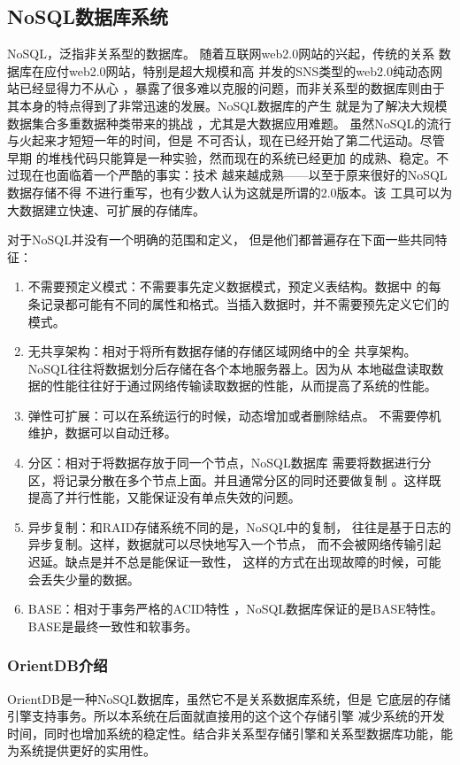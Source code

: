 \subsection{NoSQL数据库系统}
NoSQL，泛指非关系型的数据库。
随着互联网web2.0网站的兴起，传统的关系
数据库在应付web2.0网站，特别是超大规模和高
并发的SNS类型的web2.0纯动态网站已经显得力不从心
，暴露了很多难以克服的问题，而非关系型的数据库则由于
其本身的特点得到了非常迅速的发展。NoSQL数据库的产生
就是为了解决大规模数据集合多重数据种类带来的挑战
，尤其是大数据应用难题。
虽然NoSQL的流行与火起来才短短一年的时间，但是
不可否认，现在已经开始了第二代运动。尽管早期
的堆栈代码只能算是一种实验，然而现在的系统已经更加
的成熟、稳定。不过现在也面临着一个严酷的事实：技术
越来越成熟——以至于原来很好的NoSQL数据存储不得
不进行重写，也有少数人认为这就是所谓的2.0版本。该
工具可以为大数据建立快速、可扩展的存储库。

对于NoSQL并没有一个明确的范围和定义，
但是他们都普遍存在下面一些共同特征：
\begin{enumerate}[fullwidth,itemindent=2em]
	\item   不需要预定义模式：不需要事先定义数据模式，预定义表结构。数据中
	的每条记录都可能有不同的属性和格式。当插入数据时，并不需要预先定义它们的模式。
\item 	无共享架构：相对于将所有数据存储的存储区域网络中的全
共享架构。NoSQL往往将数据划分后存储在各个本地服务器上。因为从
本地磁盘读取数据的性能往往好于通过网络传输读取数据的性能，从而提高了系统的性能。
\item 	弹性可扩展：可以在系统运行的时候，动态增加或者删除结点。
不需要停机维护，数据可以自动迁移。
\item 	分区：相对于将数据存放于同一个节点，NoSQL数据库
需要将数据进行分区，将记录分散在多个节点上面。并且通常分区的同时还要做复制
。这样既提高了并行性能，又能保证没有单点失效的问题。
\item 	异步复制：和RAID存储系统不同的是，NoSQL中的复制，
往往是基于日志的异步复制。这样，数据就可以尽快地写入一个节点，
而不会被网络传输引起迟延。缺点是并不总是能保证一致性，
这样的方式在出现故障的时候，可能会丢失少量的数据。
\item 	BASE：相对于事务严格的ACID特性
	，NoSQL数据库保证的是BASE特性。BASE是最终一致性和软事务。
\end{enumerate}
\subsubsection{OrientDB介绍}
OrientDB是一种NoSQL数据库，虽然它不是关系数据库系统，但是
它底层的存储引擎支持事务。所以本系统在后面就直接用的这个这个存储引擎
减少系统的开发时间，同时也增加系统的稳定性。结合非关系型存储引擎和关系型数据库功能，能为系统提供更好的实用性。
